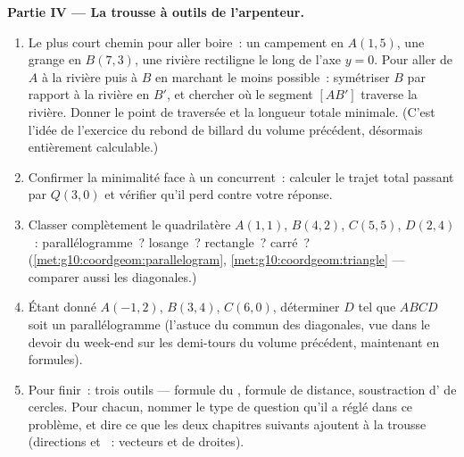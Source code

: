 \begin{problem}
\medskip
\noindent\textbf{Partie IV --- La trousse à outils de l'arpenteur.}
\begin{enumerate}[resume]
  \item Le plus court chemin pour aller boire~: un campement en
        $A(1, 5)$, une grange en $B(7, 3)$, une rivière rectiligne
        le long de l'axe $y = 0$. Pour aller de $A$ à la rivière
        puis à $B$ en marchant le moins possible~: symétriser $B$
        par rapport à la rivière en $B'$, et chercher où le segment
        $[AB']$ traverse la rivière. Donner le point de traversée et
        la longueur totale minimale. (C'est l'idée de l'exercice du
        rebond de billard du volume précédent, désormais entièrement
        calculable.)
  \item Confirmer la minimalité face à un concurrent~: calculer le
        trajet total passant par $Q(3, 0)$ et vérifier qu'il perd
        contre votre réponse.
  \item Classer complètement le quadrilatère $A(1,1)$, $B(4,2)$,
        $C(5,5)$, $D(2,4)$~: parallélogramme~? losange~?
        rectangle~? carré~? (\cref{met:g10:coordgeom:parallelogram},
        \cref{met:g10:coordgeom:triangle} --- comparer aussi les
        diagonales.)
  \item Étant donné $A(-1, 2)$, $B(3, 4)$, $C(6, 0)$, déterminer
        $D$ tel que $ABCD$ soit un parallélogramme (l'astuce du
         commun des diagonales, vue dans le devoir du week-end
        sur les demi-tours du volume précédent, maintenant en
        formules).
  \item Pour finir~: trois outils --- formule du , formule de
        distance, soustraction d' de cercles. Pour chacun,
        nommer le type de question qu'il a réglé dans ce problème,
        et dire ce que les deux chapitres suivants ajoutent à la
        trousse (directions et ~: vecteurs et
         de droites).
\end{enumerate}
\end{problem}
